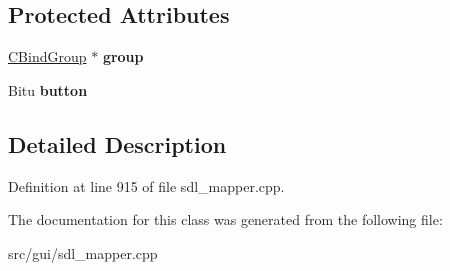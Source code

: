 \subsection*{Protected Attributes}
\begin{DoxyCompactItemize}
\item 
\hypertarget{classCJButtonBind_ade264023f83ad0202a6c5a2340d46833}{\hyperlink{classCBindGroup}{C\-Bind\-Group} $\ast$ {\bfseries group}}\label{classCJButtonBind_ade264023f83ad0202a6c5a2340d46833}

\item 
\hypertarget{classCJButtonBind_a6ef33ff006d574b8ea0df3ac18bf1a7a}{Bitu {\bfseries button}}\label{classCJButtonBind_a6ef33ff006d574b8ea0df3ac18bf1a7a}

\end{DoxyCompactItemize}


\subsection{Detailed Description}


Definition at line 915 of file sdl\-\_\-mapper.\-cpp.



The documentation for this class was generated from the following file\-:\begin{DoxyCompactItemize}
\item 
src/gui/sdl\-\_\-mapper.\-cpp\end{DoxyCompactItemize}
